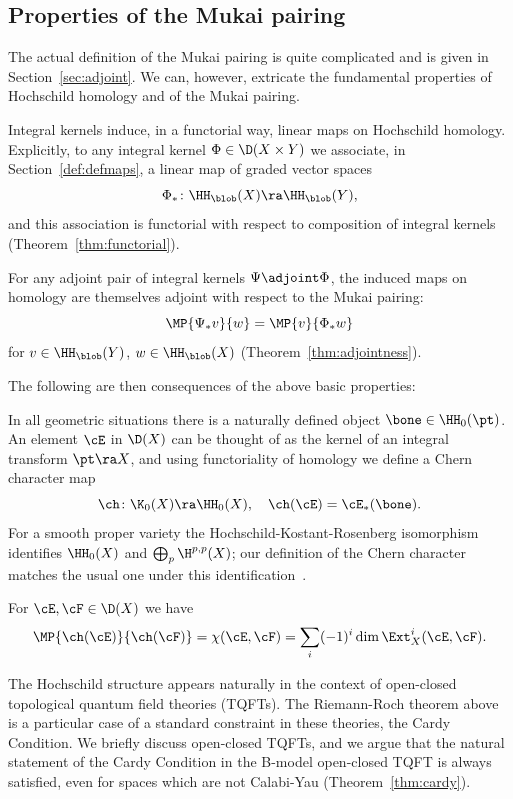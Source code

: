 \subsection*{Properties of the Mukai pairing}
The actual definition of the Mukai pairing is quite complicated and is
given in Section~\ref{sec:adjoint}.  We can, however, extricate the
fundamental properties of Hochschild homology and of the Mukai
pairing.
\begin{Description}
\item[Functoriality] Integral kernels induce, in a functorial way,
  linear maps on Hochschild homology. Explicitly, to any integral
  kernel \( \Phi\in \D(X\times Y) \) we associate, in
  Section~\ref{def:defmaps}, a linear map of graded vector spaces
  \[ \Phi_* \colon \HH_\blob(X) \ra \HH_\blob(Y), \]
  and this association is functorial with respect to composition of
  integral kernels (Theorem~\ref{thm:functorial}).
\item[{Adjointness}] For any adjoint pair of integral kernels
  $\Psi\adjoint \Phi$, the induced maps on homology are themselves
  adjoint with respect to the Mukai pairing:
  \[ \MP{\Psi_* v}{w} = \MP{v}{\Phi_* w}\]
  for $v\in \HH_\blob(Y)$, $w \in \HH_\blob(X)$
  (Theorem~\ref{thm:adjointness}).
\end{Description}
The following are then consequences of the above basic properties:
\begin{Description}
\item[{Chern character}] In all geometric situations there is a
  naturally defined object $\bone \in \HH_0(\pt)$.  An element $\cE$
  in $\D(X)$ can be thought of as the kernel of an integral transform
  $\pt \ra X$, and using functoriality of homology we define a Chern
  character map
  \[ \ch\colon\K_0(X) \ra \HH_0(X), \quad \ch(\cE) = \cE_*(\bone).  \]
  For a smooth proper variety the Hochschild-Kostant-Rosenberg
  isomorphism identifies $\HH_0(X)$ and $\bigoplus_p \H^{p,p}(X)$; our
  definition of the Chern character matches the usual one under this
  identification~\cite{CalHH2}.
\item[Semi-Hirzebruch-Riemann-Roch Theorem] For $\cE, \cF \in \D(X)$
  we have
  \[ \MP{\ch(\cE)}{\ch(\cF)} = \chi(\cE, \cF) = \sum_i (-1)^i \dim
  \Ext_X^i(\cE, \cF). \]
\item[Cardy Condition] The Hochschild structure appears naturally in
  the context of open-closed topological quantum field theories
  (TQFTs).  The Riemann-Roch theorem above is a particular case of a
  standard constraint in these theories, the Cardy Condition.  We
  briefly discuss open-closed TQFTs, and we argue that the natural
  statement of the Cardy Condition in the B-model open-closed TQFT is
  always satisfied, even for spaces which are not Calabi-Yau
  (Theorem~\ref{thm:cardy}).
\end{Description}

